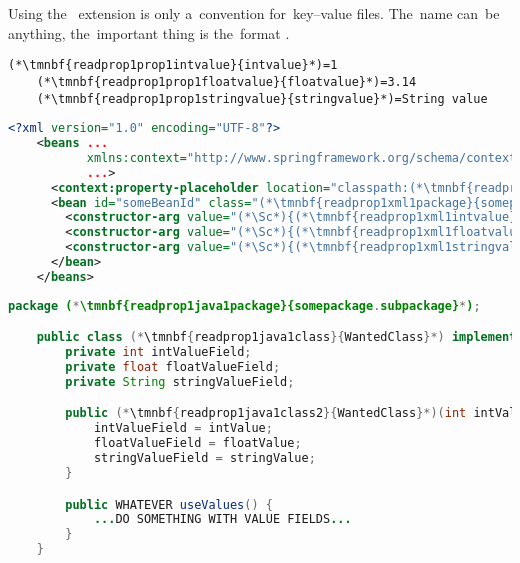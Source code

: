 \note Using the~ extension is only a~convention for~key--value files.
The~name can~be anything, the~important thing is the~format .
\newpage

\begin{lstlisting}[title={A \textit{properties} file called \tmnbf{readprop1prop1filename}{\textit{constructor.properties}}}]
    (*\tmnbf{readprop1prop1intvalue}{intvalue}*)=1
    (*\tmnbf{readprop1prop1floatvalue}{floatvalue}*)=3.14
    (*\tmnbf{readprop1prop1stringvalue}{stringvalue}*)=String value
\end{lstlisting}
\begin{lstlisting}[language=XML, title={Configuration XML}]
    <?xml version="1.0" encoding="UTF-8"?>
    <beans ...
           xmlns:context="http://www.springframework.org/schema/context"
           ...>
      <context:property-placeholder location="classpath:(*\tmnbf{readprop1xml1filename}{constructor.properties}[ForestGreen]*)" file-encoding="utf-8"/>
      <bean id="someBeanId" class="(*\tmnbf{readprop1xml1package}{somepackage.subpackage}[ForestGreen]*).(*\tmnbf{readprop1xml1class}{WantedClass}[ForestGreen]*)">
        <constructor-arg value="(*\Sc*){(*\tmnbf{readprop1xml1intvalue}{intvalue}[ForestGreen]*)}"/>
        <constructor-arg value="(*\Sc*){(*\tmnbf{readprop1xml1floatvalue}{floatvalue}[ForestGreen]*)}"/>
        <constructor-arg value="(*\Sc*){(*\tmnbf{readprop1xml1stringvalue}{stringvalue}[ForestGreen]*)}"/>
      </bean>
    </beans>
\end{lstlisting}
\begin{lstlisting}[language=Java, title={Wanted class with the constructor}]
    package (*\tmnbf{readprop1java1package}{somepackage.subpackage}*);

    public class (*\tmnbf{readprop1java1class}{WantedClass}*) implements WantedInterface {
        private int intValueField;
        private float floatValueField;
        private String stringValueField;

        public (*\tmnbf{readprop1java1class2}{WantedClass}*)(int intValue, float floatValue, String stringValue) {
            intValueField = intValue;
            floatValueField = floatValue;
            stringValueField = stringValue;
        }

        public WHATEVER useValues() {
            ...DO SOMETHING WITH VALUE FIELDS...
        }
    }
\end{lstlisting}
